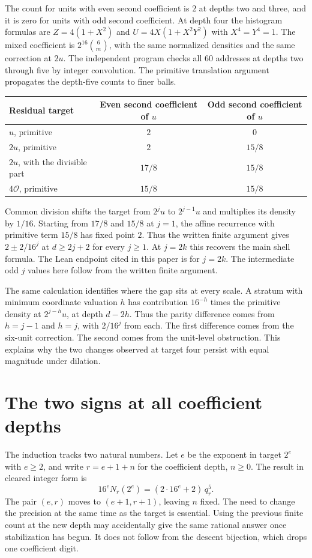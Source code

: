 \documentclass[12pt,letterpaper]{article}
\newcommand{\code}[1]{\texttt{\detokenize{#1}}}
\begin{document}
The count for units with even second coefficient is \(2\) at depths two and three, and it is zero for units with odd second coefficient. At depth four the histogram formulas are \(Z=4(1+X^2)\) and \(U=4X(1+X^2Y^2)\) with \(X^4=Y^4=1\). The mixed coefficient is \(2^{16}\binom6m\), with the same normalized densities and the same correction at \(2u\). The independent program \code{dilates/editorial_anchors.py} checks all 60 addresses at depths two through five by integer convolution. The primitive translation argument propagates the depth-five counts to finer balls.

\begin{center}
\begin{tabular}{@{}lcc@{}}
\toprule
Residual target & Even second coefficient of \(u\) & Odd second coefficient of \(u\) \\
\midrule
\(u\), primitive & \(2\) & \(0\) \\
\(2u\), primitive & \(2\) & \(15/8\) \\
\(2u\), with the divisible part & \(17/8\) & \(15/8\) \\
\(4\mathcal O\), primitive & \(15/8\) & \(15/8\) \\
\bottomrule
\end{tabular}
\end{center}

Common division shifts the target from \(2^j u\) to \(2^{j-1}u\) and multiplies its density by \(1/16\). Starting from \(17/8\) and \(15/8\) at \(j=1\), the affine recurrence with primitive term \(15/8\) has fixed point \(2\). Thus the written finite argument gives \(2\pm 2/16^j\) at \(d\geq2j+2\) for every \(j\geq1\). At \(j=2k\) this recovers the main shell formula. The Lean endpoint cited in this paper is for \(j=2k\). The intermediate odd \(j\) values here follow from the written finite argument.

The same calculation identifies where the gap sits at every scale. A stratum with minimum coordinate valuation \(h\) has contribution \(16^{-h}\) times the primitive density at \(2^{j-h}u\), at depth \(d-2h\). Thus the parity difference comes from \(h=j-1\) and \(h=j\), with \(2/16^j\) from each. The first difference comes from the six-unit correction. The second comes from the unit-level obstruction. This explains why the two changes observed at target four persist with equal magnitude under dilation.

\section{The two signs at all coefficient depths}
The induction tracks two natural numbers. Let $e$ be the exponent in target $2^e$ with $e\ge2$, and write $r=e+1+n$ for the coefficient depth, $n\ge0$. The result in cleared integer form is
\[
  16^e N_r(2^e)=(2\cdot16^e+2)\,q_r^5 .
\]
The pair $(e,r)$ moves to $(e+1,r+1)$, leaving $n$ fixed. The need to change the precision at the same time as the target is essential. Using the previous finite count at the new depth may accidentally give the same rational answer once stabilization has begun. It does not follow from the descent bijection, which drops one coefficient digit.
\end{document}
